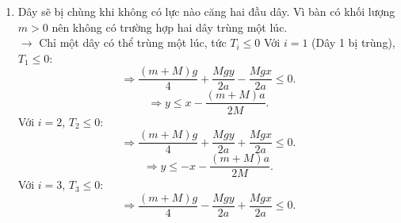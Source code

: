 \begin{enumerate}[label=(\alph*)]
\begin{enumerate}[label=(\roman*)]
    \begin{equation}
    \boxed{
        T_1 = k \cdot \left[ \dfrac{(m+M)g}{4k}+\dfrac{a}{2} \cdot \dfrac{Mgy}{ka^2}-\dfrac{a}{2}\cdot \dfrac{Mgx}{ka^2}\right] = \dfrac{(m+M)g}{4}+\dfrac{Mgy}{2a}-\dfrac{Mgx}{2a}.
            }
    \end{equation}
    \begin{equation}
    \boxed{
        T_2 = k \cdot \left[ \dfrac{(m+M)g}{4k}+\dfrac{a}{2} \cdot \dfrac{Mgy}{ka^2}+\dfrac{a}{2}\cdot \dfrac{Mgx}{ka^2}\right] = \dfrac{(m+M)g}{4}+\dfrac{Mgy}{2a}+\dfrac{Mgx}{2a}.
            }
    \end{equation}
    \begin{equation}
    \boxed{
        T_3 = k \cdot \left[ \dfrac{(m+M)g}{4k}-\dfrac{a}{2} \cdot \dfrac{Mgy}{ka^2}+\dfrac{a}{2}\cdot \dfrac{Mgx}{ka^2}\right] = \dfrac{(m+M)g}{4}-\dfrac{Mgy}{2a}+\dfrac{Mgx}{2a}.
            }
    \end{equation}
    \begin{equation}
    \boxed{
        T_4 = k \cdot \left[ \dfrac{(m+M)g}{4k}-\dfrac{a}{2} \cdot \dfrac{Mgy}{ka^2}-\dfrac{a}{2}\cdot \dfrac{Mgx}{ka^2}\right] = \dfrac{(m+M)g}{4}-\dfrac{Mgy}{2a}-\dfrac{Mgx}{2a}.
            }
    \end{equation}
\item Dây sẽ bị chùng khi không có lực nào căng hai đầu dây. Vì bàn có khối lượng $m>0$ nên không có trường hợp hai dây trùng một lúc.
\\$\longrightarrow$ Chỉ một dây có thể trùng một lúc, tức $T_i \le 0$
Với $i =1$ (Dây 1 bị trùng), $T_1 \le 0$:
\begin{equation}
\Longrightarrow\dfrac{(m+M)g}{4}+\dfrac{Mgy}{2a}-\dfrac{Mgx}{2a} \le 0.
\end{equation}
\begin{equation}
\label{eq:S4_01}
\Longrightarrow
y \le x -\dfrac{(m+M)a}{2M}.
\end{equation}
Với $i =2$, $T_2 \le 0$:
\begin{equation}
\Longrightarrow\dfrac{(m+M)g}{4}+\dfrac{Mgy}{2a}+\dfrac{Mgx}{2a} \le 0.
\end{equation}
\begin{equation}
\label{eq:S4_02}
\Longrightarrow
y \le -x -\dfrac{(m+M)a}{2M}.
\end{equation}
Với $i =3$, $T_3 \le 0$:
\begin{equation}
\Longrightarrow\dfrac{(m+M)g}{4}-\dfrac{Mgy}{2a}+\dfrac{Mgx}{2a} \le 0.
\end{equation}
\begin{equation}

\end{equation}
\end{enumerate}
\end{enumerate}
